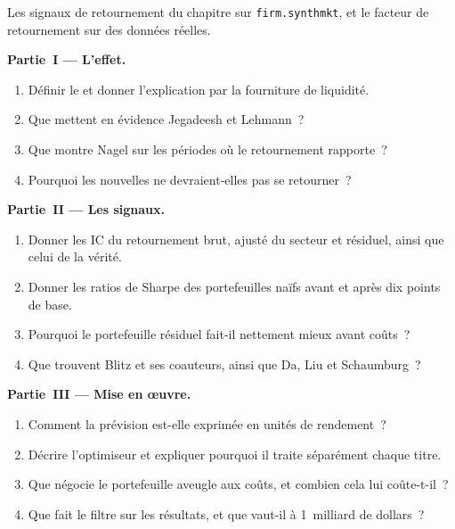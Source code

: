 \begin{problem}\label{pb:s1:short-term-reversal:1}
Les signaux de retournement du chapitre sur \texttt{firm.synthmkt}, et le facteur de retournement sur des données réelles.

\medskip\noindent\textbf{Partie~I --- L'effet.}
\begin{enumerate}
\item Définir le  et donner l'explication par la fourniture de liquidité.
\item Que mettent en évidence Jegadeesh et Lehmann~?
\item Que montre Nagel sur les périodes où le retournement rapporte~?
\item Pourquoi les nouvelles ne devraient-elles pas se retourner~?
\end{enumerate}

\medskip\noindent\textbf{Partie~II --- Les signaux.}
\begin{enumerate}[resume]
\item Donner les IC du retournement brut, ajusté du secteur et résiduel, ainsi que celui de la vérité.
\item Donner les ratios de Sharpe des portefeuilles naïfs avant et après dix points de base.
\item Pourquoi le portefeuille résiduel fait-il nettement mieux avant coûts~?
\item Que trouvent Blitz et ses coauteurs, ainsi que Da, Liu et Schaumburg~?
\end{enumerate}

\medskip\noindent\textbf{Partie~III --- Mise en œuvre.}
\begin{enumerate}[resume]
\item Comment la prévision est-elle exprimée en unités de rendement~?
\item Décrire l'optimiseur et expliquer pourquoi il traite séparément chaque titre.
\item Que négocie le portefeuille aveugle aux coûts, et combien cela lui coûte-t-il~?
\item Que fait le filtre sur les résultats, et que vaut-il à 1~milliard de dollars~?
\end{enumerate}


\end{problem}
